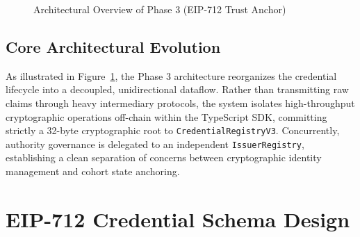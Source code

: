 \begin{figure}[H]
\caption{Architectural Overview of Phase 3 (EIP-712 Trust Anchor)}
\label{fig:phase3-architecture}
\end{figure}

\subsection{Core Architectural Evolution}

As illustrated in Figure~\ref{fig:phase3-architecture}, the Phase 3 architecture reorganizes the credential lifecycle into a decoupled, unidirectional dataflow. Rather than transmitting raw claims through heavy intermediary protocols, the system isolates high-throughput cryptographic operations off-chain within the TypeScript SDK, committing strictly a 32-byte cryptographic root to \texttt{CredentialRegistryV3}. Concurrently, authority governance is delegated to an independent \texttt{IssuerRegistry}, establishing a clean separation of concerns between cryptographic identity management and cohort state anchoring.

\section{EIP-712 Credential Schema Design}

